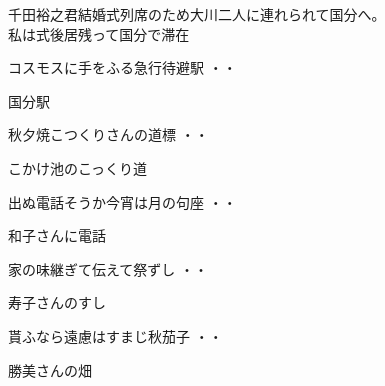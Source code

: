 千田裕之君結婚式列席のため大川二人に連れられて国分へ。\\
私は式後居残って国分で滞在
\begin{shiika}コスモスに手をふる急行待避駅
\hfill{・・}\end{shiika}
\qquad\qquad\qquad 国分駅\\
\begin{shiika}秋夕焼こつくりさんの道標
\hfill{・・}\end{shiika}
\qquad\qquad\qquad こかけ池のこっくり道\\
\begin{shiika}出ぬ電話そうか今宵は月の句座
\hfill{・・}\end{shiika}
\qquad\qquad\qquad 和子さんに電話\\
\begin{shiika}家の味継ぎて伝えて祭ずし
\hfill{・・}\end{shiika}
\qquad\qquad\qquad 寿子さんのすし\\
\begin{shiika}貰ふなら遠慮はすまじ秋茄子
\hfill{・・}\end{shiika}
\qquad\qquad\qquad 勝美さんの畑\\

